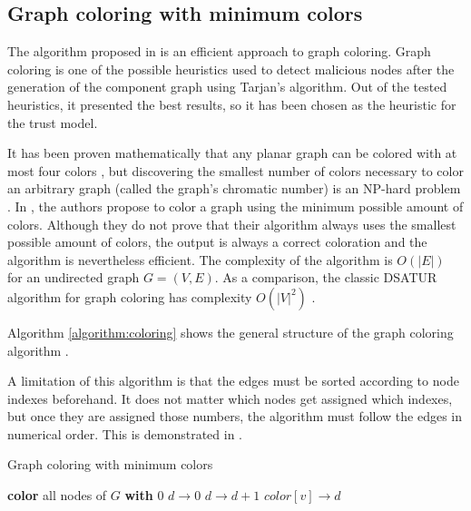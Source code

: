 \documentclass[conference]{IEEEtran}
\begin{document}
\subsection{Graph coloring with minimum colors}
\label{section:coloring}
The algorithm proposed in \cite{mittal2011graph} is an efficient approach to graph coloring.
Graph coloring is one of the possible heuristics used to detect malicious nodes after the generation of the component graph using Tarjan's algorithm.
Out of the tested heuristics, it presented the best results, so it has been chosen as the heuristic for the trust model.

It has been proven mathematically that any planar graph can be colored with at most four colors \cite{appel1976every}, but discovering the smallest number of colors necessary to color an arbitrary graph (called the graph's chromatic number) is an NP-hard problem \cite{sanchez1989determining}.
In \cite{mittal2011graph}, the authors propose to color a graph using the minimum possible amount of colors.
Although they do not prove that their algorithm always uses the smallest possible amount of colors, the output is always a correct coloration and the algorithm is nevertheless efficient.
The complexity of the algorithm is $O(|E|)$ for an undirected graph $G = (V,E)$.
As a comparison, the classic DSATUR algorithm for graph coloring has complexity $O(|V|^2)$ \cite{brelaz1979new}.

Algorithm \autoref{algorithm:coloring} shows the general structure of the graph coloring algorithm  \cite{mittal2011graph} \cite{vernize2013dissertation}.

A limitation of this algorithm is that the edges must be sorted according to node indexes beforehand.
It does not matter which nodes get assigned which indexes, but once they are assigned those numbers, the algorithm must follow the edges in numerical order.
This is demonstrated in \cite{vernize2013dissertation}.

\begin{algorithm}
\caption{Graph coloring with minimum colors}\label{algorithm:coloring}
\begin{algorithmic}[1]


\State \textbf{color} all nodes of $G$ \textbf{with} 0
\State $d \rightarrow 0$
			\State $d \rightarrow d+1$
		\EndIf
		\State $color[v] \rightarrow d$
	\EndIf
\EndFor


\EndFunction
\end{algorithmic}
\end{algorithm}
\end{document}
